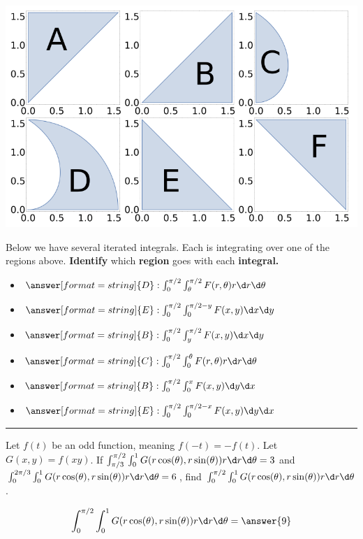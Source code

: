 \documentclass{ximera}
\begin{document}
\begin{problem}
\begin{onlineOnly}
\begin{image}
      \includegraphics{combinedRegion.png}
    \end{image}
  \end{onlineOnly}
  Below we have several iterated integrals. Each is integrating over one
  of the regions above. \textbf{Identify} which \textbf{region} goes with each \textbf{integral.}
  \begin{itemize}
    \item[] $\answer[format=string]{D}: \int_0^{\pi/2} \int_{\theta}^{\pi/2}F(r,\theta)r \d r\d\theta$
    \item[] $\answer[format=string]{E}: \int_0^{\pi/2} \int_{0}^{\pi/2-y}F(x,y) \d x\d y$
    \item[] $\answer[format=string]{B}: \int_0^{\pi/2} \int_{y}^{\pi/2}F(x,y) \d x\d y$
    \item[] $\answer[format=string]{C}: \int_0^{\pi/2} \int_0^{\theta}F(r,\theta)r \d r\d \theta$
    \item[] $\answer[format=string]{B}: \int_0^{\pi/2} \int_{0}^{x}F(x,y) \d y\d x$
    \item[] $\answer[format=string]{E}: \int_0^{\pi/2} \int_{0}^{\pi/2-x}F(x,y) \d y\d x$
    \pdfOnly{\end{multicols}}
  \end{itemize}
\end{problem}

\hrule

\begin{problem}
  Let $f(t)$ be an odd function, meaning $f(-t) = -f(t)$. Let $G(x,y)
  = f(xy)$. If $\int_{\pi/3}^{\pi/2} \int_0^1 G(r \cos(\theta),r\sin(\theta))r\d r\d\theta = 3$ and $\int_{0}^{2\pi/3} \int_0^1 G(r \cos(\theta),r\sin(\theta))r\d r\d\theta = 6$, find  $\int_{0}^{\pi/2} \int_0^1 G(r \cos(\theta),r\sin(\theta))r\d r\d\theta$.
  \begin{prompt}
  \[
  \int_{0}^{\pi/2} \int_0^1 G(r \cos(\theta),r\sin(\theta))r\d r\d\theta = \answer{9}
  \]
  \end{prompt}
\end{problem}

\vfill
\end{document}
